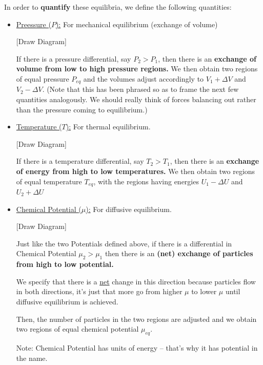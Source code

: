 \documentclass{article}
\begin{document}
\vskip 0.5cm
In order to \textbf{quantify} these equilibria, we define the following quantities:
\begin{itemize}
  \item \underline{Preessure ($P$):} For mechanical equilibrium (exchange of volume)
  
  \vskip 0.5cm
  [Draw Diagram]

  \vskip 0.25cm
  If there is a pressure differential, say $P_2 > P_1$, then there is an \textbf{exchange of volume from low to high pressure regions.} We then obtain two regions of equal pressure $P_{eq}$ and the volumes adjust accordingly to $V_1 + \Delta V$ and $V_2 - \Delta V$. (Note that this has been phrased so as to frame the next few quantities analogously. We should really think of forces balancing out rather than the pressure coming to equilibrium.)

  \vskip 0.5cm
  \item \underline{Temperature ($T$):} For thermal equilibrium.
  
  \vskip 0.5cm
  [Draw Diagram]

  \vskip 0.25cm
  If there is a temperature differential, say $T_2 > T_1$, then there is an \textbf{exchange of energy from high to low temperatures.} We then obtain two regions of equal temperature $T_{eq}$, with the regions having energies $U_1 - \Delta U$ and $U_2 + \Delta U$
  
  \vskip 0.5cm
  \item \underline{Chemical Potential ($\mu$):} For diffusive equilibrium.
  \vskip 0.25cm

  [Draw Diagram]

  Just like the two Potentials defined above, if there is a differential in Chemical Potential $\mu_2 > \mu_1$ then there is an \textbf{(net) exchange of particles from high to low potential.} 

  \vskip 0.25cm
  We specify that there is a \underline{net} change in this direction because particles flow in both directions, it's just that more go from higher $\mu$ to lower $\mu$ until diffusive equilibrium is achieved.

  \vskip 0.25cm
  Then, the number of particles in the two regions are adjusted and we obtain two regions of equal chemical potential $\mu_{eq}$.

  \vskip 0.25cm
  Note: Chemical Potential has units of energy -- that's why it has  potential in the name.
\end{itemize}

\vskip 0.5cm
\end{document}
